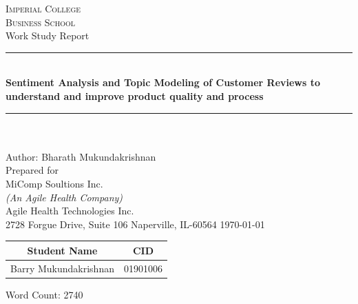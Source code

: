 \documentclass[11pt, letterpaper]{article}
\newcommand{\HRule}{\rule{\linewidth}{0.5mm}}
\begin{document}
\nocite{*}

\begin{titlepage}
\center 
\textsc{\LARGE Imperial College}\\[1.25cm]
\textsc{\Large Business School}\\[0.5cm]
\large Work Study Report\\[1.5cm] 
\HRule \\[0.3 cm]
{\huge \bfseries Sentiment Analysis and Topic Modeling of Customer Reviews to understand and improve product quality and process}\\%
\HRule \\[0.5cm]
{\large \textbf \\ Author: Bharath Mukundakrishnan}
{\large \textbf \\ Prepared for\\ MiComp Soultions Inc. \\\tiny \textit{(An Agile Health Company)}\\\large Agile Health Technologies Inc.\\2728 Forgue Drive, Suite 106 Naperville, IL-60564} 
{\large \today }\\[2cm] %
\begin{center}
 \begin{tabular}{||c c||} 
 \hline
 \textbf{Student Name} & \textbf{CID} \\
 \hline\hline
 Barry Mukundakrishnan & 01901006 \\ [0.5ex] 
 \hline
\end{tabular}
\end{center}
\vfill
Word Count: 2740
\vfill 
\end{titlepage}
\end{document}
